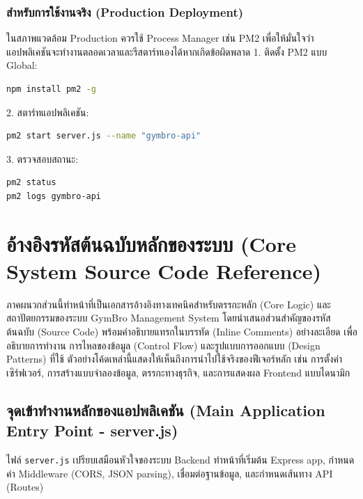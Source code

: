\subsection{สำหรับการใช้งานจริง (Production Deployment)}
ในสภาพแวดล้อม Production ควรใช้ Process Manager เช่น PM2 เพื่อให้มั่นใจว่าแอปพลิเคชันจะทำงานตลอดเวลาและรีสตาร์ทเองได้หากเกิดข้อผิดพลาด
1. ติดตั้ง PM2 แบบ Global:
\begin{lstlisting}[language=bash, frame=single]
npm install pm2 -g
\end{lstlisting}
2. สตาร์ทแอปพลิเคชัน:
\begin{lstlisting}[language=bash, frame=single]
pm2 start server.js --name "gymbro-api"
\end{lstlisting}
3. ตรวจสอบสถานะ:
\begin{lstlisting}[language=bash, frame=single]
pm2 status
pm2 logs gymbro-api
\end{lstlisting}

\chapter{อ้างอิงรหัสต้นฉบับหลักของระบบ (Core System Source Code Reference)}

ภาคผนวกส่วนนี้ทำหน้าที่เป็นเอกสารอ้างอิงทางเทคนิคสำหรับตรรกะหลัก (Core Logic) และสถาปัตยกรรมของระบบ GymBro Management System โดยนำเสนอส่วนสำคัญของรหัสต้นฉบับ (Source Code) พร้อมคำอธิบายแทรกในบรรทัด (Inline Comments) อย่างละเอียด เพื่ออธิบายการทำงาน การไหลของข้อมูล (Control Flow) และรูปแบบการออกแบบ (Design Patterns) ที่ใช้ ตัวอย่างโค้ดเหล่านี้แสดงให้เห็นถึงการนำไปใช้จริงของฟีเจอร์หลัก เช่น การตั้งค่าเซิร์ฟเวอร์, การสร้างแบบจำลองข้อมูล, ตรรกะทางธุรกิจ, และการแสดงผล Frontend แบบไดนามิก

\section{จุดเข้าทำงานหลักของแอปพลิเคชัน (Main Application Entry Point - server.js)}
ไฟล์ \texttt{server.js} เปรียบเสมือนหัวใจของระบบ Backend ทำหน้าที่เริ่มต้น Express app, กำหนดค่า Middleware (CORS, JSON parsing), เชื่อมต่อฐานข้อมูล, และกำหนดเส้นทาง API (Routes)

